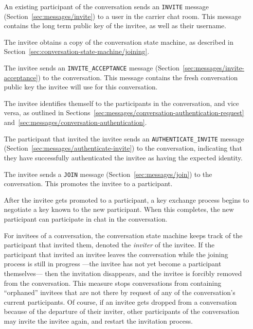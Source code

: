 \documentclass{article}
\def\npmessage#1{\texttt{#1}}
\begin{document}
\begin{description}[noitemsep]
\item[Step 1.] An existing participant of the conversation sends an \npmessage{INVITE} message (Section~\ref{sec:messages/invite}) to a user in the carrier chat room. This message contains the long term public key of the invitee, as well as their username.
\item[Step 2.] The invitee obtains a copy of the conversation state machine, as described in Section~\ref{sec:conversation-state-machine/joining}.
\item[Step 3.] The invitee sends an \npmessage{INVITE\_ACCEPTANCE} message (Section~\ref{sec:messages/invite-acceptance}) to the conversation. This message contains the fresh conversation public key the invitee will use for this conversation.
\item[Step 4.] The invitee identifies themself to the participants in the conversation, and vice versa, as outlined in Sections~\ref{sec:messages/conversation-authentication-request} and~\ref{sec:messages/conversation-authentication}.
\item[Step 5.] The participant that invited the invitee sends an \npmessage{AUTHENTICATE\_INVITE} message (Section~\ref{sec:messages/authenticate-invite}) to the conversation, indicating that they have successfully authenticated the invitee as having the expected identity.
\item[Step 6.] The invitee sends a \npmessage{JOIN} message (Section~\ref{sec:messages/join}) to the conversation. This promotes the invitee to a participant.
\item[Aftermath.] After the invitee gets promoted to a participant, a key exchange process begins to negotiate a key known to the new participant. When this completes, the new participant can participate in chat in the conversation.
\end{description}

For invitees of a conversation, the conversation state machine keeps track of the participant that invited them, denoted the \emph{inviter} of the invitee.
If the participant that invited an invitee leaves the conversation while the joining process is still in progress ---the invitee has not yet become a participant themselves--- then the invitation disappears, and the invitee is forcibly removed from the conversation.
This measure stops conversations from containing ``orphaned'' invitees that are not there by request of any of the conversation's current participants.
Of course, if an invitee gets dropped from a conversation because of the departure of their inviter, other participants of the conversation may invite the invitee again, and restart the invitation process.
\end{document}
